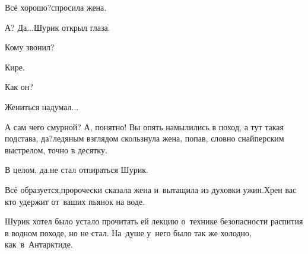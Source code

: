 {	\diagdash Всё хорошо?\mdash спросила жена.
	
	\diagdash А? Да$\ldots$\mdash Шурик открыл глаза.
	
	\diagdash Кому звонил?
	
	\diagdash Кире.
	
	\diagdash Как он? 
	
	\diagdash Жениться надумал$\ldots$ 
	
	\diagdash А сам чего смурной? А, понятно! Вы опять намылились в поход, а тут такая подстава, да?\mdash ледяным взглядом скользнула жена, попав, словно снайперским выстрелом, точно в десятку.%
	
	\diagdash В целом, да.\mdash не стал отпираться Шурик.
	
	\diagdash Всё образуется,\mdash пророчески сказала жена и~вытащила из духовки ужин.\mdash Хрен вас кто удержит от~ваших пьянок на воде.
	
	Шурик хотел было устало прочитать ей лекцию о~технике безопасности распития в водном походе, но не стал.  На~душе у~него было так же холодно, как~в~Антарктиде.%
	
	\vspace{-0.2cm}
%	
	\begin{center}
	\end{center}
}